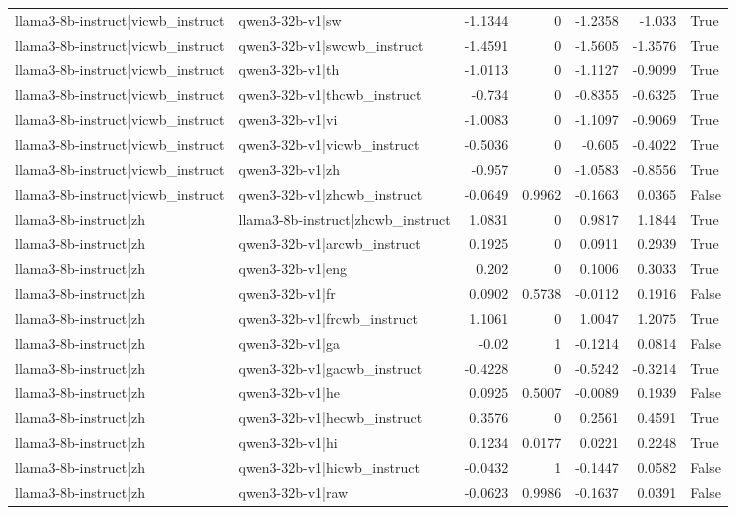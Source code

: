 \begin{table}
\begin{tabular}{l l r r r r l}
llama3-8b-instruct|vicwb_instruct & qwen3-32b-v1|sw & -1.1344 & 0 & -1.2358 & -1.033 & True \\
llama3-8b-instruct|vicwb_instruct & qwen3-32b-v1|swcwb_instruct & -1.4591 & 0 & -1.5605 & -1.3576 & True \\
llama3-8b-instruct|vicwb_instruct & qwen3-32b-v1|th & -1.0113 & 0 & -1.1127 & -0.9099 & True \\
llama3-8b-instruct|vicwb_instruct & qwen3-32b-v1|thcwb_instruct & -0.734 & 0 & -0.8355 & -0.6325 & True \\
llama3-8b-instruct|vicwb_instruct & qwen3-32b-v1|vi & -1.0083 & 0 & -1.1097 & -0.9069 & True \\
llama3-8b-instruct|vicwb_instruct & qwen3-32b-v1|vicwb_instruct & -0.5036 & 0 & -0.605 & -0.4022 & True \\
llama3-8b-instruct|vicwb_instruct & qwen3-32b-v1|zh & -0.957 & 0 & -1.0583 & -0.8556 & True \\
llama3-8b-instruct|vicwb_instruct & qwen3-32b-v1|zhcwb_instruct & -0.0649 & 0.9962 & -0.1663 & 0.0365 & False \\
llama3-8b-instruct|zh & llama3-8b-instruct|zhcwb_instruct & 1.0831 & 0 & 0.9817 & 1.1844 & True \\
llama3-8b-instruct|zh & qwen3-32b-v1|arcwb_instruct & 0.1925 & 0 & 0.0911 & 0.2939 & True \\
llama3-8b-instruct|zh & qwen3-32b-v1|eng & 0.202 & 0 & 0.1006 & 0.3033 & True \\
llama3-8b-instruct|zh & qwen3-32b-v1|fr & 0.0902 & 0.5738 & -0.0112 & 0.1916 & False \\
llama3-8b-instruct|zh & qwen3-32b-v1|frcwb_instruct & 1.1061 & 0 & 1.0047 & 1.2075 & True \\
llama3-8b-instruct|zh & qwen3-32b-v1|ga & -0.02 & 1 & -0.1214 & 0.0814 & False \\
llama3-8b-instruct|zh & qwen3-32b-v1|gacwb_instruct & -0.4228 & 0 & -0.5242 & -0.3214 & True \\
llama3-8b-instruct|zh & qwen3-32b-v1|he & 0.0925 & 0.5007 & -0.0089 & 0.1939 & False \\
llama3-8b-instruct|zh & qwen3-32b-v1|hecwb_instruct & 0.3576 & 0 & 0.2561 & 0.4591 & True \\
llama3-8b-instruct|zh & qwen3-32b-v1|hi & 0.1234 & 0.0177 & 0.0221 & 0.2248 & True \\
llama3-8b-instruct|zh & qwen3-32b-v1|hicwb_instruct & -0.0432 & 1 & -0.1447 & 0.0582 & False \\
llama3-8b-instruct|zh & qwen3-32b-v1|raw & -0.0623 & 0.9986 & -0.1637 & 0.0391 & False \\

\end{tabular}
\end{table}
